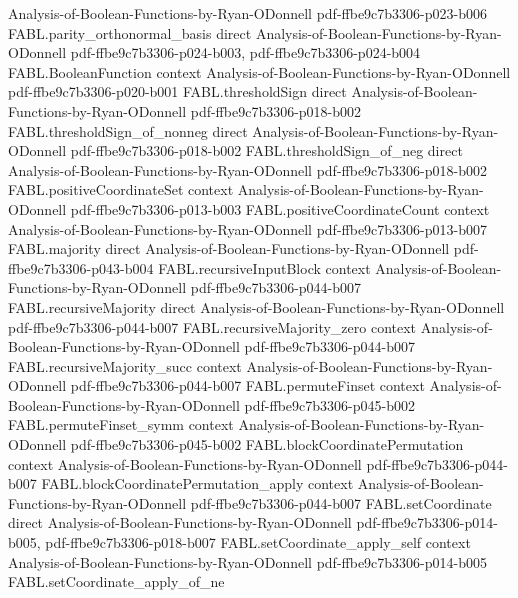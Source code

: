 \begin{theorem}
  {Analysis-of-Boolean-Functions-by-Ryan-ODonnell}
  {pdf-ffbe9c7b3306-p023-b006}
\proofstep
  {FABL.parity_orthonormal_basis}
  {direct}
  {Analysis-of-Boolean-Functions-by-Ryan-ODonnell}
  {pdf-ffbe9c7b3306-p024-b003,
    pdf-ffbe9c7b3306-p024-b004}
\proofstep
  {FABL.BooleanFunction}
  {context}
  {Analysis-of-Boolean-Functions-by-Ryan-ODonnell}
  {pdf-ffbe9c7b3306-p020-b001}
\proofstep
  {FABL.thresholdSign}
  {direct}
  {Analysis-of-Boolean-Functions-by-Ryan-ODonnell}
  {pdf-ffbe9c7b3306-p018-b002}
\proofstep
  {FABL.thresholdSign_of_nonneg}
  {direct}
  {Analysis-of-Boolean-Functions-by-Ryan-ODonnell}
  {pdf-ffbe9c7b3306-p018-b002}
\proofstep
  {FABL.thresholdSign_of_neg}
  {direct}
  {Analysis-of-Boolean-Functions-by-Ryan-ODonnell}
  {pdf-ffbe9c7b3306-p018-b002}
\proofstep
  {FABL.positiveCoordinateSet}
  {context}
  {Analysis-of-Boolean-Functions-by-Ryan-ODonnell}
  {pdf-ffbe9c7b3306-p013-b003}
\proofstep
  {FABL.positiveCoordinateCount}
  {context}
  {Analysis-of-Boolean-Functions-by-Ryan-ODonnell}
  {pdf-ffbe9c7b3306-p013-b007}
\proofstep
  {FABL.majority}
  {direct}
  {Analysis-of-Boolean-Functions-by-Ryan-ODonnell}
  {pdf-ffbe9c7b3306-p043-b004}
\proofstep
  {FABL.recursiveInputBlock}
  {context}
  {Analysis-of-Boolean-Functions-by-Ryan-ODonnell}
  {pdf-ffbe9c7b3306-p044-b007}
\proofstep
  {FABL.recursiveMajority}
  {direct}
  {Analysis-of-Boolean-Functions-by-Ryan-ODonnell}
  {pdf-ffbe9c7b3306-p044-b007}
\proofstep
  {FABL.recursiveMajority_zero}
  {context}
  {Analysis-of-Boolean-Functions-by-Ryan-ODonnell}
  {pdf-ffbe9c7b3306-p044-b007}
\proofstep
  {FABL.recursiveMajority_succ}
  {context}
  {Analysis-of-Boolean-Functions-by-Ryan-ODonnell}
  {pdf-ffbe9c7b3306-p044-b007}
\proofstep
  {FABL.permuteFinset}
  {context}
  {Analysis-of-Boolean-Functions-by-Ryan-ODonnell}
  {pdf-ffbe9c7b3306-p045-b002}
\proofstep
  {FABL.permuteFinset_symm}
  {context}
  {Analysis-of-Boolean-Functions-by-Ryan-ODonnell}
  {pdf-ffbe9c7b3306-p045-b002}
\proofstep
  {FABL.blockCoordinatePermutation}
  {context}
  {Analysis-of-Boolean-Functions-by-Ryan-ODonnell}
  {pdf-ffbe9c7b3306-p044-b007}
\proofstep
  {FABL.blockCoordinatePermutation_apply}
  {context}
  {Analysis-of-Boolean-Functions-by-Ryan-ODonnell}
  {pdf-ffbe9c7b3306-p044-b007}
\proofstep
  {FABL.setCoordinate}
  {direct}
  {Analysis-of-Boolean-Functions-by-Ryan-ODonnell}
  {pdf-ffbe9c7b3306-p014-b005,
    pdf-ffbe9c7b3306-p018-b007}
\proofstep
  {FABL.setCoordinate_apply_self}
  {context}
  {Analysis-of-Boolean-Functions-by-Ryan-ODonnell}
  {pdf-ffbe9c7b3306-p014-b005}
\proofstep
  {FABL.setCoordinate_apply_of_ne}

\end{theorem}
